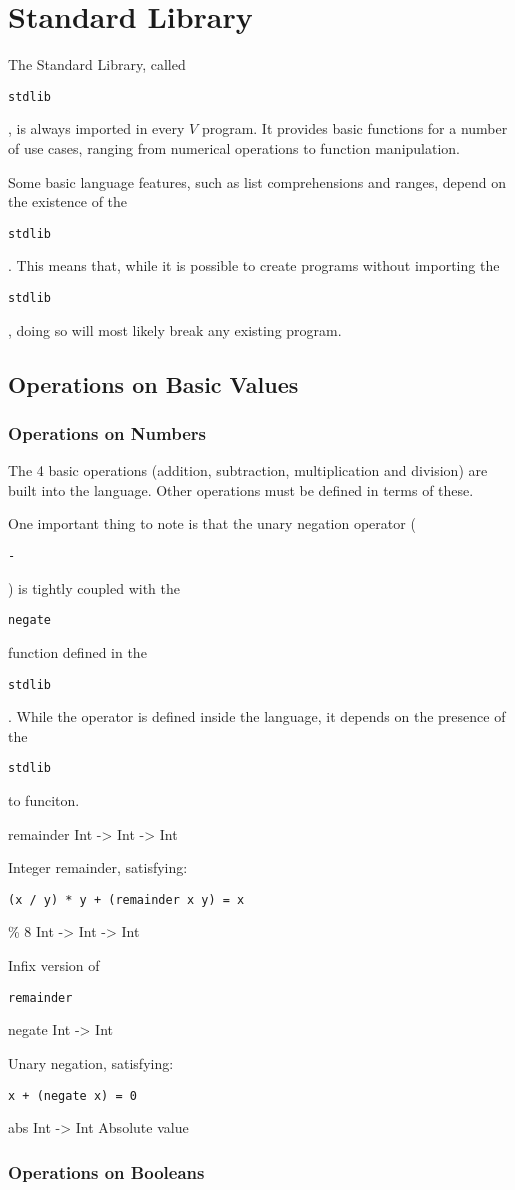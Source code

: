 \documentclass{article}
\def\code#1{\begin{footnotesize}\texttt{#1}\end{footnotesize}}
\begin{document}
\newpage

\section{Standard Library}\label{Standard Library}

The Standard Library, called \code{stdlib}, is always imported in every $V$ program.
It provides basic functions for a number of use cases, ranging from numerical operations to function manipulation.

Some basic language features, such as list comprehensions and ranges, depend on the existence of the \code{stdlib}.
This means that, while it is possible to create programs without importing the \code{stdlib}, doing so will most likely break any existing program.

\subsection{Operations on Basic Values}

\subsubsection{Operations on Numbers}

The 4 basic operations (addition, subtraction, multiplication and division) are built into the language.
Other operations must be defined in terms of these.

One important thing to note is that the unary negation operator (\code{-}) is tightly coupled with the \code{negate} function defined in the \code{stdlib}.
While the operator is defined inside the language, it depends on the presence of the \code{stdlib} to funciton.

\medskip

\libfunction
  {remainder}
  {Int -> Int -> Int}
  {Integer remainder, satisfying:

  \code{(x / y) * y + (remainder x y) = x}}

\liboperator
  {\%}
  {\leftassociative}
  {8}
  {Int -> Int -> Int}
  {Infix version of \code{remainder}}

\libfunction
  {negate}
  {Int -> Int}
  {Unary negation, satisfying:

  \code{x + (negate x) = 0}}

\libfunction
  {abs}
  {Int -> Int}
  {Absolute value}

\subsubsection{Operations on Booleans}
\end{document}
